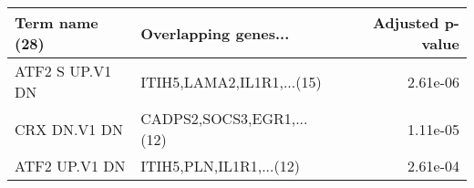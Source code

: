 \begin{tabular}{llr}
\toprule
 Term name (28) &      Overlapping genes... &  Adjusted p-value \\
\midrule
ATF2 S UP.V1 DN & ITIH5,LAMA2,IL1R1,...(15) &          2.61e-06 \\
   CRX DN.V1 DN & CADPS2,SOCS3,EGR1,...(12) &          1.11e-05 \\
  ATF2 UP.V1 DN &   ITIH5,PLN,IL1R1,...(12) &          2.61e-04 \\
\bottomrule
\end{tabular}
